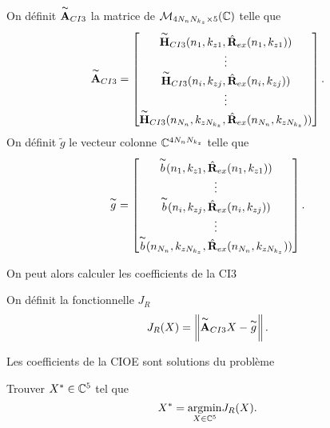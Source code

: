     \begin{defn}
      On définit \(\overset{\thicksim}{\mathbf{A}}_{CI3}\) la matrice de \(\mathcal{M}_{4N_{n}N_{k_z}\times5}(\mathbb C)\) telle que
      \begin{equation*}
        \overset{\thicksim}{\mathbf{A}}_{CI3} = 
        \begin{bmatrix}
          \overset{\thicksim}{\mathbf{H}}_{CI3}(n_1,k_{z1},\hat{\mathbf{R}}_{ex}(n_1,k_{z1}))
          \\
          \vdots
          \\
          \overset{\thicksim}{\mathbf{H}}_{CI3}(n_i,k_{zj},\hat{\mathbf{R}}_{ex}(n_i,k_{zj}))
          \\
          \vdots
          \\
          \overset{\thicksim}{\mathbf{H}}_{CI3}(n_{N_n},k_{zN_{k_z}},\hat{\mathbf{R}}_{ex}(n_{N_n},k_{zN_{k_z}}))
        \end{bmatrix}.
      \end{equation*}
      On définit \(\tilde{g}\) le vecteur colonne \(\mathbb C^{4N_{n}N_{k_z}}\) telle que
      \begin{equation*}
        \overset{\thicksim}{g} = 
        \begin{bmatrix}
          \overset{\thicksim}{b}(n_1,k_{z1},\hat{\mathbf{R}}_{ex}(n_1,k_{z1}))
          \\
          \vdots
          \\
          \overset{\thicksim}{b}(n_i,k_{zj},\hat{\mathbf{R}}_{ex}(n_i,k_{zj}))
          \\
          \vdots
          \\
          \overset{\thicksim}{b}(n_{N_n},k_{zN_{k_z}},\hat{\mathbf{R}}_{ex}(n_{N_n},k_{zN_{k_z}}))
        \end{bmatrix}.
      \end{equation*}
    \end{defn}

    On peut alors calculer les coefficients de la CI3

    \begin{defn}
      On définit la fonctionnelle \(J_R\)
      \begin{equation*}
        J_R(X) = \left\lVert\overset{\thicksim}{\mathbf{A}}_{CI3}X - \overset{\thicksim}{g}\right\rVert.
      \end{equation*}
    \end{defn}

    \begin{thm}

      Les coefficients de la CIOE sont solutions du problème

      Trouver \(X^* \in \mathbb C^5\) tel que
      \begin{equation*}
        X^* = {\underset{X\in \mathbb C^5}{\operatorname{argmin}}} J_R(X).
      \end{equation*}
    \end{thm}

